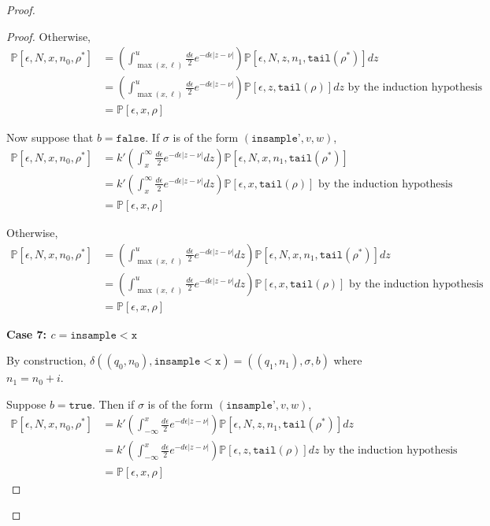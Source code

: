 \documentclass[12pt]{article}
\newcommand{\PP}{\mathbb{P}}
\newcommand{\lguard}{\texttt{insample} < \texttt{x}}
\theoremstyle{definition}
\begin{document}
\begin{proof}
\begin{proof}
	
	Otherwise, 
	\begin{align*}
		\PP[\epsilon, N, x, n_0, \rho^*] &= \left(\int_{\max(x, \ell)}^u\frac{d\epsilon}{2}e^{-d\epsilon|z-\nu|}\right)\PP[\epsilon, N, z, n_1, \texttt{tail}(\rho^*)]dz \\
		&= \left(\int_{\max(x, \ell)}^u\frac{d\epsilon}{2}e^{-d\epsilon|z-\nu|}\right)\PP[\epsilon, z, \texttt{tail}(\rho)]dz \text{ by the induction hypothesis }\\
		&= \PP[\epsilon, x, \rho]
	\end{align*}

	Now suppose that $b = \texttt{false}$. If $\sigma$ is of the form $(\texttt{insample'}, v, w)$, 
	\begin{align*}
		\PP[\epsilon, N, x, n_0, \rho^*] &= k'\left(\int_x^\infty\frac{d\epsilon}{2}e^{-d\epsilon|z-\nu|}dz\right)\PP[\epsilon, N, x, n_1, \texttt{tail}(\rho^*)]\\
		&= k'\left(\int_x^\infty\frac{d\epsilon}{2}e^{-d\epsilon|z-\nu|}dz\right)\PP[\epsilon, x, \texttt{tail}(\rho)] \text{ by the induction hypothesis }\\
		&= \PP[\epsilon, x, \rho]
	\end{align*}


	Otherwise, 
	\begin{align*}
		\PP[\epsilon, N, x, n_0, \rho^*] &= \left(\int_{\max(x, \ell)}^u\frac{d\epsilon}{2}e^{-d\epsilon|z-\nu|}dz\right)\PP[\epsilon, N, x, n_1, \texttt{tail}(\rho^*)]dz \\
		&= \left(\int_{\max(x, \ell)}^u\frac{d\epsilon}{2}e^{-d\epsilon|z-\nu|}dz\right)\PP[\epsilon, x, \texttt{tail}(\rho)] \text{ by the induction hypothesis }\\
		&= \PP[\epsilon, x, \rho]
	\end{align*}

	\textbf{Case 7: $c = \lguard$}

	By construction, $\delta((q_0, n_0), \lguard) = ((q_1, n_1), \sigma, b)$ where $n_1 = n_0+i$. 

	Suppose $b = \texttt{true}$. Then if $\sigma$ is of the form $(\texttt{insample'}, v, w)$, 
		\begin{align*}
			\PP[\epsilon, N, x, n_0, \rho^*] &= k'\left(\int_{-\infty}^x\frac{d\epsilon}{2}e^{-d\epsilon|z-\nu|}\right)\PP[\epsilon, N, z, n_1, \texttt{tail}(\rho^*)]dz \\
			&= k'\left(\int_{-\infty}^x\frac{d\epsilon}{2}e^{-d\epsilon|z-\nu|}\right)\PP[\epsilon, z, \texttt{tail}(\rho)]dz \text{ by the induction hypothesis }\\
			&= \PP[\epsilon, x, \rho]
		\end{align*}
	

\end{proof}
\end{proof}
\end{document}
